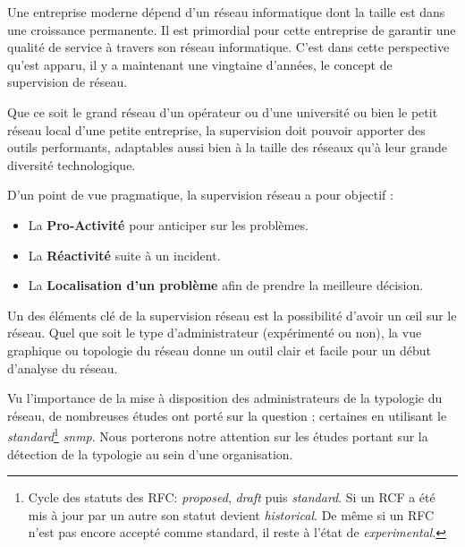 \introduction
Une entreprise moderne dépend d'un réseau informatique dont la taille est dans une croissance permanente. Il est primordial pour cette entreprise de garantir une qualité de service à travers son réseau informatique. C'est dans cette perspective qu'est apparu, il y a maintenant une vingtaine d'années, le concept de supervision de réseau.

Que ce soit le grand réseau d'un opérateur ou d'une université ou bien le petit réseau local d'une petite entreprise, la supervision
doit pouvoir apporter des outils performants, adaptables aussi bien à la taille des réseaux qu'à leur grande diversité technologique.

D'un point de vue pragmatique, la supervision réseau a pour objectif :
\begin{itemize}
\item La \textbf{Pro-Activité} pour anticiper sur les problèmes.
\item La \textbf{Réactivité} suite à un incident.
\item La \textbf{Localisation d'un problème} afin de prendre la meilleure décision.
\end{itemize}


Un des éléments clé de la supervision réseau est la possibilité d'avoir un œil sur le réseau. Quel que soit le type d'administrateur (expérimenté ou non), la vue graphique ou topologie du réseau donne un outil clair et facile pour un début d'analyse du réseau. 

Vu l'importance de la mise à disposition des administrateurs de la typologie du réseau, de nombreuses études ont porté sur la question ; certaines en utilisant  le  \emph{standard}\footnote{Cycle des statuts des RFC: \emph{proposed}, \emph{draft} puis \emph{standard}. Si un RCF a été mis à jour par un autre son statut devient \emph{historical}. De même si un RFC n'est pas encore accepté comme standard, il reste à l'état de \emph{experimental}.} \emph{\gls*{snmp}}. Nous porterons notre attention sur les études portant sur la détection de la typologie au sein d'une organisation.

